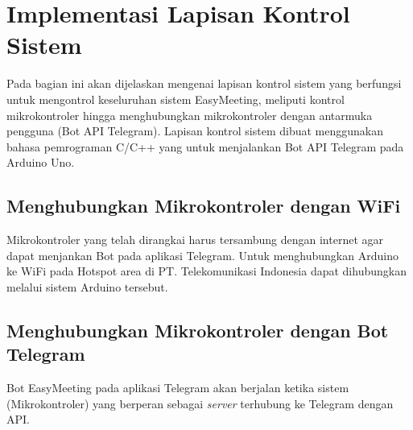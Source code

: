 \section{Implementasi Lapisan Kontrol Sistem}
\tab Pada bagian ini akan dijelaskan mengenai lapisan kontrol sistem yang berfungsi untuk mengontrol keseluruhan sistem EasyMeeting, meliputi kontrol mikrokontroler hingga menghubungkan mikrokontroler dengan antarmuka pengguna (Bot API Telegram). Lapisan kontrol sistem dibuat menggunakan bahasa pemrograman C/C++ yang untuk menjalankan Bot API Telegram pada Arduino Uno.

\subsection{Menghubungkan Mikrokontroler dengan WiFi}
\tab Mikrokontroler yang telah dirangkai harus tersambung dengan internet agar dapat menjankan Bot pada aplikasi Telegram. Untuk menghubungkan Arduino ke WiFi pada Hotspot area di PT. Telekomunikasi Indonesia dapat dihubungkan melalui sistem Arduino tersebut.


\subsection{Menghubungkan Mikrokontroler dengan Bot Telegram}
Bot EasyMeeting pada aplikasi Telegram akan berjalan ketika sistem (Mikrokontroler) yang berperan sebagai \textit{server} terhubung ke Telegram dengan API.


